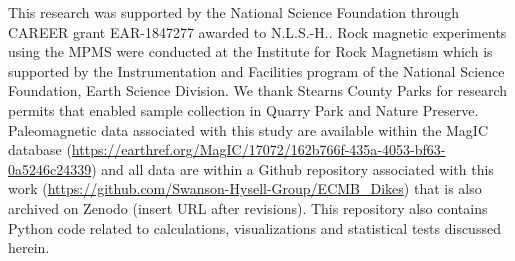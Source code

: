 \documentclass[draft]{agujournal2019}
\begin{document}


%
%
%
%
%
%
%
%


\acknowledgments
This research was supported by the National Science Foundation through CAREER grant EAR-1847277 awarded to N.L.S.-H.. Rock magnetic experiments using the MPMS were conducted at the Institute for Rock Magnetism which is supported by the Instrumentation and Facilities program of the National Science Foundation, Earth Science Division. We thank Stearns County Parks for research permits that enabled sample collection in Quarry Park and Nature Preserve. Paleomagnetic data associated with this study are available within the MagIC database (\url{https://earthref.org/MagIC/17072/162b766f-435a-4053-bf63-0a5246c24339}) and all data are within a Github repository associated with this work (\url{https://github.com/Swanson-Hysell-Group/ECMB_Dikes}) that is also archived on Zenodo (insert URL after revisions). This repository also contains Python code related to calculations, visualizations and statistical tests discussed herein.  

\end{document}
